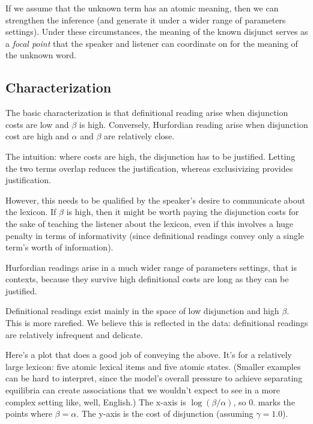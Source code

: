 \documentclass{article}
\begin{document}
\begin{examples}
\item If we assume that the unknown term has an atomic meaning, then
  we can strengthen the inference (and generate it under a wider range
  of parameters settings).  Under these circumstances, the meaning of
  the known disjunct serves as a \emph{focal point} that the speaker
  and listener can coordinate on for the meaning of the unknown word.
\end{examples}


\subsection{Characterization}\label{sec:analysis:characterization}

\begin{examples}
\item The basic characterization is that definitional reading arise
  when disjunction costs are low and $\beta$ is high. Conversely,
  Hurfordian reading arise when disjunction cost are high and $\alpha$
  and $\beta$ are relatively close.
  
\item The intuition: where costs are high, the disjunction has to be
  justified. Letting the two terms overlap reduces the justification,
  whereas exclusivizing provides justification. 

\item However, this needs to be qualified by the speaker's desire to
  communicate about the lexicon. If $\beta$ is high, then it might be
  worth paying the disjunction costs for the sake of teaching the
  listener about the lexicon, even if this involves a huge penalty in
  terms of informativity (since definitional readings convey only
  a single term's worth of information).

\item Hurfordian readings arise in a much wider range of parameters
  settings, that is contexts, because they survive high definitional
  costs are long as they can be justified.

\item Definitional readings exist mainly in the space of low
  disjunction and high $\beta$. This is more rarefied. We believe this
  is reflected in the data: definitional readings are relatively
  infrequent and delicate.

\item Here's a plot that does a good job of conveying the above.  It's
  for a relatively large lexicon: five atomic lexical items and five
  atomic states. (Smaller examples can be hard to interpret, since the
  model's overall pressure to achieve separating equilibria can
  create associations that we wouldn't expect to see in a more complex
  setting like, well, English.) The x-axis is $\log(\beta/\alpha)$, so
  $0.$ marks the points where $\beta = \alpha$. The y-axis is 
  the cost of disjunction (assuming $\gamma=1.0$).


\end{examples}
\end{document}
